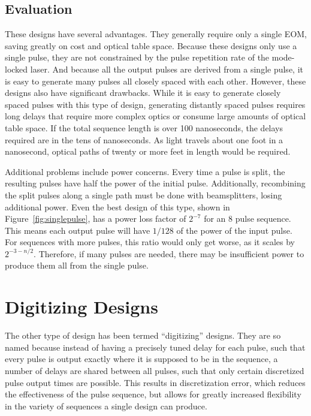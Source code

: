 \documentclass[pdftex,12pt,a4paper]{article}
\begin{document}
\subsection{Evaluation}

These designs have several advantages. They generally require only a single EOM, saving greatly on cost and optical table space. Because these designs only use a single pulse, they are not constrained by the pulse repetition rate of the mode-locked laser. And because all the output pulses are derived from a single pulse, it is easy to generate many pulses all closely spaced with each other. However, these designs also have significant drawbacks. While it is easy to generate closely spaced pulses with this type of design, generating distantly spaced pulses requires long delays that require more complex optics or consume large amounts of optical table space. If the total sequence length is over 100 nanoseconds, the delays required are in the tens of nanoseconds. As light travels about one foot in a nanosecond, optical paths of twenty or more feet in length would be required. 

Additional problems include power concerns. Every time a pulse is split, the resulting pulses have half the power of the initial pulse. Additionally, recombining the split pulses along a single path must be done with beamsplitters, losing additional power. Even the best design of this type, shown in Figure~\ref{fig:singlepulse}, has a power loss factor of $2^{-7}$ for an 8 pulse sequence. This means each output pulse will have $1/128$ of the power of the input pulse. For sequences with more pulses, this ratio would only get worse, as it scales by $2^{-3-n/2}$. Therefore, if many pulses are needed, there may be insufficient power to produce them all from the single pulse.




\section{Digitizing Designs}
\label{sec:digitizing_designs}
The other type of design has been termed “digitizing” designs. They are so named because instead of having a precisely tuned delay for each pulse, such that every pulse is output exactly where it is supposed to be in the sequence, a number of delays are shared between all pulses, such that only certain discretized pulse output times are possible. This results in discretization error, which reduces the effectiveness of the pulse sequence, but allows for greatly increased flexibility in the variety of sequences a single design can produce.
\end{document}
